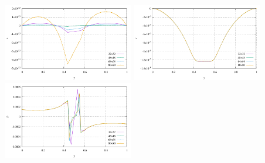 \begin{center}
\includegraphics[width=5.7cm]{python_codes/fieldstone_18/results/block/profile_u_NS}
\includegraphics[width=5.7cm]{python_codes/fieldstone_18/results/block/profile_v_NS}
\includegraphics[width=5.7cm]{python_codes/fieldstone_18/results/block/profile_p_NS}
\end{center}



